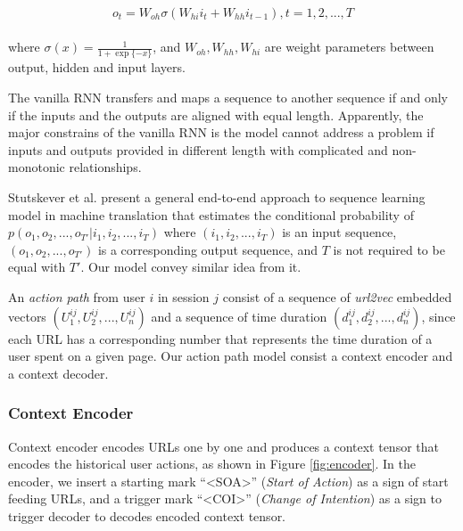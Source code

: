 \begin{align}
\label{eqn:bptt}
\begin{split}
    o_t = W_{oh} \sigma \left( W_{hi}i_{t} + W_{hh}i_{t-1}\right), t=1,2,...,T
\end{split}
\end{align}

where $\sigma(x) = \frac{1}{1+\exp\{-x\}}$,
and $W_{oh}, W_{hh}, W_{hi}$ are weight parameters between output, hidden and input layers.

The vanilla RNN transfers and maps a sequence to another sequence if and only if the inputs
and the outputs are aligned with equal length. Apparently, the major constrains of the vanilla RNN
is the model cannot address a problem if inputs and outputs provided in different length with 
complicated and non-monotonic relationships.

Stutskever et al. \cite{DBLP:journals/corr/SutskeverVL14} present a general end-to-end approach
to sequence learning model in machine translation that estimates the conditional probability of 
$p(o_1, o_2, ..., o_{T'} | i_1, i_2, ..., i_T)$ where $(i_1, i_2, ..., i_T)$ is an input sequence,
$(o_1, o_2, ..., o_{T'})$ is a corresponding output sequence, and $T$ is not required to be equal with $T'$.
Our model convey similar idea from it.

An \emph{action path} from user $i$ in session $j$ consist of 
a sequence of \emph{url2vec} embedded vectors $(U^{ij}_1, U^{ij}_2, ..., U^{ij}_n)$ 
and a sequence of time duration $(d^{ij}_1, d^{ij}_2, ..., d^{ij}_n)$, since each URL 
has a corresponding number that represents the time duration of a user spent on a given page.
Our action path model consist a context encoder and a context decoder. 

\subsubsection{Context Encoder}

Context encoder encodes URLs one by one and produces a context tensor that encodes 
the historical user actions, as shown in Figure \ref{fig:encoder}. 
In the encoder, we insert a starting mark ``<SOA>'' (\emph{Start of Action})
as a sign of start feeding URLs, and a trigger mark ``<COI>'' (\emph{Change of Intention}) as
a sign to trigger decoder to decodes encoded context tensor.

